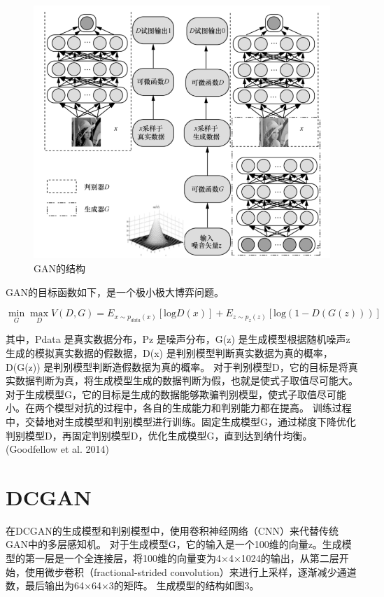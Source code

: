 \documentclass[hyperref, a4paper]{ctexart}
\begin{document}
\begin{figure}
\centering
\includegraphics{1.png}
\caption{GAN的结构}
\end{figure}

GAN的目标函数如下，是一个极小极大博弈问题。

\[\mathop{\min}\limits_{G} \mathop{\max}\limits_{D}\mathit{V(D,G)} = E_{x\sim p_{data}(x)}[ \mathrm{log} D(x)]+E_{z\sim p_z(z)}[ \mathrm{log}(1-D(G(z)))]\]

其中，Pdata 是真实数据分布，Pz 是噪声分布，G(z) 是生成模型根据随机噪声z
生成的模拟真实数据的假数据，D(x)
是判别模型判断真实数据为真的概率，D(G(z))
是判别模型判断造假数据为真的概率。
对于判别模型D，它的目标是将真实数据判断为真，将生成模型生成的数据判断为假，也就是使式子取值尽可能大。对于生成模型G，它的目标是生成的数据能够欺骗判别模型，使式子取值尽可能小。在两个模型对抗的过程中，各自的生成能力和判别能力都在提高。
训练过程中，交替地对生成模型和判别模型进行训练。固定生成模型G，通过梯度下降优化判别模型D，再固定判别模型D，优化生成模型G，直到达到纳什均衡。(Goodfellow
et al. 2014)

\hypertarget{dcgan}{%
\section{DCGAN}\label{dcgan}}

在DCGAN的生成模型和判别模型中，使用卷积神经网络（CNN）来代替传统GAN中的多层感知机。
对于生成模型G，它的输入是一个100维的向量z。生成模型的第一层是一个全连接层，将100维的向量变为4×4×1024的输出，从第二层开始，使用微步卷积（fractional-strided
convolution）来进行上采样，逐渐减少通道数，最后输出为64×64×3的矩阵。
生成模型的结构如图3。
\end{document}

